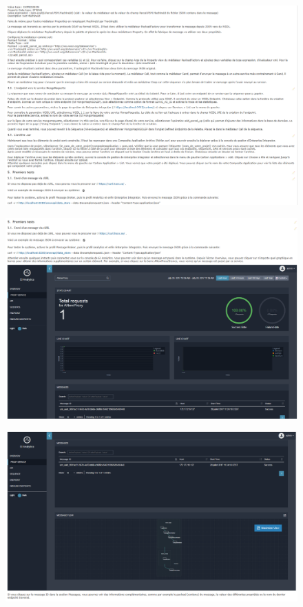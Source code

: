 \documentclass[12pt,a4paper,twoside]{article}
\begin{document}
\begin{figure}[H]
	\includegraphics[width=\textwidth, height= 0.45\textheight]{wiki7.PNG}
\end{figure}
\begin{figure}[H]
	\includegraphics[width=\textwidth, height= 0.45\textheight]{wiki8.PNG}
\end{figure}
\begin{figure}[H]
	\includegraphics[width=\textwidth, height= 0.45\textheight]{wiki9.PNG}
\end{figure}
\newpage
\end{document}

